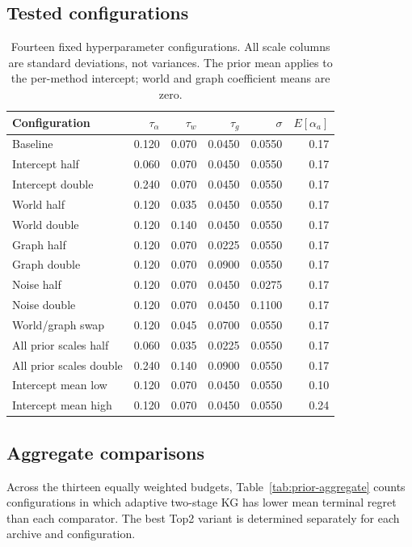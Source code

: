\documentclass[10pt,a4paper]{article}
\begin{document}
\subsection{Tested configurations}
\begin{table}[htbp]
\centering
\small
\caption{Fourteen fixed hyperparameter configurations. All scale columns
are standard deviations, not variances. The prior mean applies to the
per-method intercept; world and graph coefficient means are zero.}
\label{tab:prior-grid}
\begin{tabular}{lrrrrr}
\toprule
Configuration & $\tau_\alpha$ & $\tau_w$ & $\tau_g$ & $\sigma$ & $E[\alpha_a]$\\
\midrule
Baseline & 0.120 & 0.070 & 0.0450 & 0.0550 & 0.17\\
Intercept half & 0.060 & 0.070 & 0.0450 & 0.0550 & 0.17\\
Intercept double & 0.240 & 0.070 & 0.0450 & 0.0550 & 0.17\\
World half & 0.120 & 0.035 & 0.0450 & 0.0550 & 0.17\\
World double & 0.120 & 0.140 & 0.0450 & 0.0550 & 0.17\\
Graph half & 0.120 & 0.070 & 0.0225 & 0.0550 & 0.17\\
Graph double & 0.120 & 0.070 & 0.0900 & 0.0550 & 0.17\\
Noise half & 0.120 & 0.070 & 0.0450 & 0.0275 & 0.17\\
Noise double & 0.120 & 0.070 & 0.0450 & 0.1100 & 0.17\\
World/graph swap & 0.120 & 0.045 & 0.0700 & 0.0550 & 0.17\\
All prior scales half & 0.060 & 0.035 & 0.0225 & 0.0550 & 0.17\\
All prior scales double & 0.240 & 0.140 & 0.0900 & 0.0550 & 0.17\\
Intercept mean low & 0.120 & 0.070 & 0.0450 & 0.0550 & 0.10\\
Intercept mean high & 0.120 & 0.070 & 0.0450 & 0.0550 & 0.24\\
\bottomrule
\end{tabular}
\end{table}

\subsection{Aggregate comparisons}
Across the thirteen equally weighted budgets, Table~\ref{tab:prior-aggregate}
counts configurations in which adaptive two-stage KG has lower mean terminal
regret than each comparator. The best Top2 variant is determined separately
for each archive and configuration.
\end{document}

